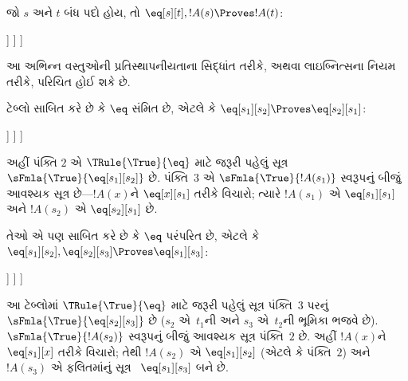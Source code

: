 \begin{ex}
જો $s$ અને $t$ બંધ પદો હોય, તો $\eq[s][t], !A(s) \Proves !A(t)$:
\begin{oltableau}
  [\sFmla{\False}{\formula{A}(t)}, just = \TAss
    [\sFmla{\True}{\eq[s][t]}, just = \TAss
      [\sFmla{\True}{\formula{A}(s)}, just = \TAss
        [\sFmla{\True}{\formula{A}(t)}, just={\TRule{\True}{\eq}[2, 3]}, close]
      ]
    ]
  ]
\end{oltableau}
આ અભિન્ન વસ્તુઓની પ્રતિસ્થાપનીયતાના સિદ્ધાંત તરીકે, અથવા લાઇબ્નિત્સના
નિયમ તરીકે, પરિચિત હોઈ શકે છે.

ટેબ્લો સાબિત કરે છે કે $\eq$ સંમિત છે, એટલે કે
$\eq[s_1][s_2] \Proves \eq[s_2][s_1]$:
\begin{oltableau}
  [\sFmla{\False}{\eq[s_2][s_1]}, just = \TAss
    [\sFmla{\True}{\eq[s_1][s_2]}, just = \TAss
      [\sFmla{\True}{\eq[s_1][s_1]}, just = {$\eq$}
        [\sFmla{\True}{\eq[s_2][s_1]}, just = {\TRule{\True}{\eq}[2, 3]}, close]
      ]
    ]
  ]
\end{oltableau}
અહીં પંક્તિ $2$ એ $\TRule{\True}{\eq}$ માટે જરૂરી પહેલું
સૂત્ર~$\sFmla{\True}{\eq[s_1][s_2]}$ છે. પંક્તિ~$3$ એ
$\sFmla{\True}{!A(s_1)}$ સ્વરૂપનું બીજું આવશ્યક સૂત્ર છે---$!A(x)$ને
$\eq[x][s_1]$ તરીકે વિચારો; ત્યારે $!A(s_1)$ એ $\eq[s_1][s_1]$ અને
$!A(s_2)$ એ $\eq[s_2][s_1]$ છે.

તેઓ એ પણ સાબિત કરે છે કે $\eq$ પરંપરિત છે, એટલે કે
$\eq[s_1][s_2], \eq[s_2][s_3] \Proves \eq[s_1][s_3]$:
\begin{oltableau}
  [\sFmla{\False}{\eq[s_1][s_3]}, just = \TAss
    [\sFmla{\True}{\eq[s_1][s_2]}, just = \TAss
      [\sFmla{\True}{\eq[s_2][s_3]}, just = \TAss
        [\sFmla{\True}{\eq[s_1][s_3]}, just = {\TRule{\True}{\eq}[3, 2]}, close]
      ]
    ]
  ]
\end{oltableau}
આ ટેબ્લોમાં $\TRule{\True}{\eq}$ માટે જરૂરી પહેલું સૂત્ર
પંક્તિ~$3$ પરનું $\sFmla{\True}{\eq[s_2][s_3]}$ છે ($s_2$ એ~$t_1$ની
અને $s_3$ એ~$t_2$ની ભૂમિકા ભજવે છે). $\sFmla{\True}{!A(s_2)}$
સ્વરૂપનું બીજું આવશ્યક સૂત્ર પંક્તિ~$2$ છે. અહીં $!A(x)$ને
$\eq[s_1][x]$ તરીકે વિચારો; તેથી $!A(s_2)$ એ $\eq[s_1][s_2]$ (એટલે
કે પંક્તિ~$2$) અને $!A(s_3)$ એ ફલિતમાંનું સૂત્ર
~$\eq[s_1][s_3]$ બને છે.
\end{ex}

